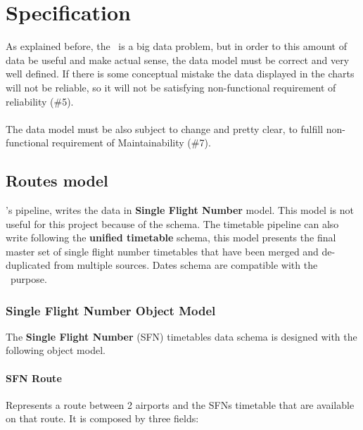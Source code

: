 
\chapter{Specification}

\label{chapter05}

As explained before, the \thesis\ is a big data problem, but in order to this amount of data be useful and make actual sense, the data model must be correct and very well defined. If there is some conceptual mistake the data displayed in the charts will not be reliable, so it will not be satisfying non-functional requirement of reliability (\#5).
\\\\
The data model must be also subject to change and pretty clear, to fulfill non-functional requirement of Maintainability (\#7).


\section{Routes model} \label{routes_model}

\squad's pipeline, writes the data in \textbf{Single Flight Number} model. This model is not useful for this project because of the  schema. The timetable pipeline can also write following the \textbf{unified timetable} schema, this model presents the final master set of single flight number timetables that have been merged and de-duplicated from multiple sources. Dates schema are compatible with the \thesis\ purpose.

\subsection{Single Flight Number Object Model} \label{sfn-model}

The \textbf{Single Flight Number} (SFN) timetables data schema is designed with the following object model.

\subsubsection{SFN Route}

Represents a route between 2 airports and the SFNs timetable that are available on that route. It is composed by three fields:


